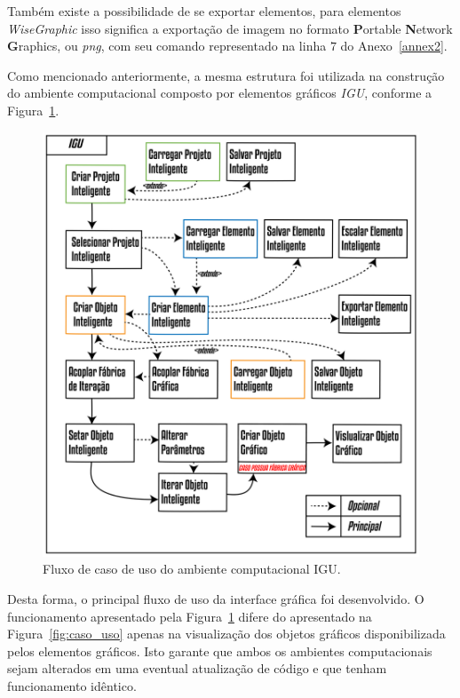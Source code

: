 Também existe a possibilidade de se exportar elementos, para elementos \textit{WiseGraphic} isso significa a exportação de imagem no formato \textbf{P}ortable \textbf{N}etwork \textbf{G}raphics, ou \textit{png}, com seu comando representado na linha $7$ do Anexo~\ref{annex2}.

Como mencionado anteriormente, a mesma estrutura foi utilizada na construção do ambiente computacional composto por elementos gráficos \textit{IGU}, conforme a Figura~\ref{fig:caso_uso2}.

\begin{figure}[!htbp]
	\centering
	\includegraphics[width=\linewidth]{Figures/CasoDeUso2@16x.png}
	\caption{Fluxo de caso de uso do ambiente computacional IGU.}
	\label{fig:caso_uso2}
\end{figure}

Desta forma, o principal fluxo de uso da interface gráfica foi desenvolvido. O funcionamento apresentado pela Figura~\ref{fig:caso_uso2} difere do apresentado na Figura~\ref{fig:caso_uso} apenas na visualização dos objetos gráficos disponibilizada pelos elementos gráficos. Isto garante que ambos os ambientes computacionais sejam alterados em uma eventual atualização de código e que tenham funcionamento idêntico.

